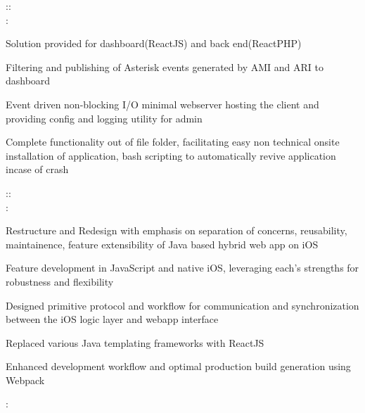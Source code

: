 \documentclass[]{hemant-style}
\begin{document}
\begin{minipage}[]{\textwidth}
\begin{minipage}{\textwidth}
\begin{minipage}[t][][c]{.75\textwidth}
                            ::\\
                            :
                            \begin{hitemize}
                                \item Solution provided for dashboard(ReactJS) and back end(ReactPHP)
                                \item Filtering and publishing of Asterisk events generated by AMI and ARI to dashboard
                                \item Event driven non-blocking I/O minimal webserver hosting the client and  providing config and logging utility for admin
                                \item Complete functionality out of file folder, facilitating easy non technical onsite installation of application, bash scripting to automatically revive  application incase of crash
                            \end{hitemize}
                            ::\\
                            :
                            \begin{hitemize}
                                \item Restructure and Redesign with emphasis on separation of concerns, reusability, maintainence, feature extensibility of Java based hybrid web app on iOS
                                \item Feature development in JavaScript and native iOS, leveraging each’s strengths for robustness and flexibility
                                \item Designed primitive protocol and workflow for communication and synchronization between the iOS logic layer and webapp interface
                                \item Replaced various Java templating frameworks with ReactJS
                                \item Enhanced development workflow and optimal production build generation using Webpack
                            \end{hitemize}
                            :

\end{minipage}
\end{minipage}
\end{minipage}
\end{document}
